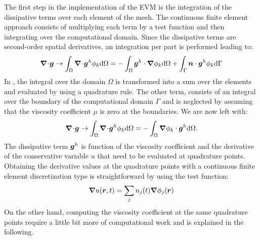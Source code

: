 The first step in the implementation of the EVM is the integration of the dissipative terms over each element of the mesh. The continuous finite element approach consists of multiplying each term by a test function and then integrating over the computational domain. Since the dissipative terms are second-order spatial derivatives, an integration per part is performed leading to:
%
\begin{equation}\label{eq:diss_term_sct2}
\boldsymbol{\nabla}\! \cdot \! \boldsymbol g \rightarrow \int_\Omega \boldsymbol{\nabla}\! \cdot \! \boldsymbol g^h \phi_k \text{d}\Omega  = -\int_\Omega \boldsymbol g^h \cdot \boldsymbol{\nabla} \phi_k \text{d}\Omega + \int_\Gamma \boldsymbol n \cdot \boldsymbol g^h \phi_k \text{d}\Gamma
\end{equation} 
%
In , the integral over the domain $\Omega$ is transformed into a sum over the elements and evaluated by using a quadrature rule. The other term, consists of an integral over the boundary of the computational domain $\Gamma$ and is neglected by assuming that the viscosity coefficient $\mu$ is zero at the boundaries. We are now left with:
\begin{equation}\label{eq:diss_term2_sct2}
\boldsymbol{\nabla}\! \cdot \! \boldsymbol g \rightarrow \int_\Omega \boldsymbol{\nabla}\! \cdot \! \boldsymbol g^h \phi_k \text{d}\Omega  = -\int_\Omega \boldsymbol{\nabla} \phi_k \cdot \boldsymbol g^h\text{d}\Omega.
\end{equation} 
%
The dissipative term $\boldsymbol g^h$ is function of the viscosity coefficient and the derivative of the conservative variable $u$ that need to be evaluated at quadrature points. Obtaining the derivative values at the quadrature points with a continuous finite element discretization type is straightforward by using the test function: 
%
\begin{equation}
\boldsymbol{\nabla} u(\boldsymbol r,t) = \sum_j u_j(t) \boldsymbol{\nabla} \phi_j(\boldsymbol r)
\end{equation}
%
On the other hand, computing the viscosity coefficient at the same quadrature points require a little bit more of computational work and is explained in the following. \\

